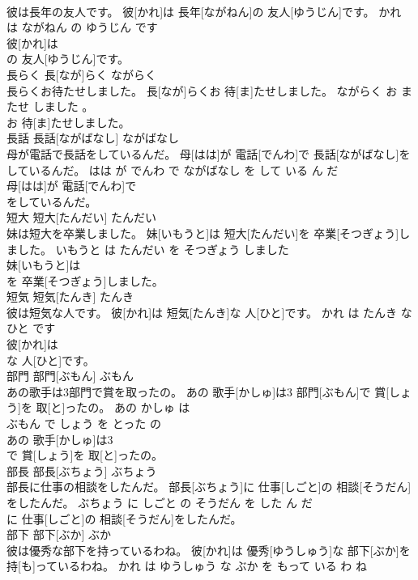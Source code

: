 \documentclass[8pt]{extreport}
\begin{document}
\begin{CJK}{UTF8}{min}
\\	彼は長年の友人です。	彼[かれ]は 長年[ながねん]の 友人[ゆうじん]です。	かれ は ながねん の ゆうじん です	
\\	彼[かれ]は
\\	の 友人[ゆうじん]です。			
\\	長らく	長[なが]らく	ながらく	
\\	長らくお待たせしました。	長[なが]らくお 待[ま]たせしました。	ながらく お またせ しました 。	
\\	お 待[ま]たせしました。			
\\	長話	長話[ながばなし]	ながばなし	
\\	母が電話で長話をしているんだ。	母[はは]が 電話[でんわ]で 長話[ながばなし]をしているんだ。	はは が でんわ で ながばなし を して いる ん だ	
\\	母[はは]が 電話[でんわ]で
\\	をしているんだ。			
\\	短大	短大[たんだい]	たんだい	
\\	妹は短大を卒業しました。	妹[いもうと]は 短大[たんだい]を 卒業[そつぎょう]しました。	いもうと は たんだい を そつぎょう しました	
\\	妹[いもうと]は
\\	を 卒業[そつぎょう]しました。			
\\	短気	短気[たんき]	たんき	
\\	彼は短気な人です。	彼[かれ]は 短気[たんき]な 人[ひと]です。	かれ は たんき な ひと です	
\\	彼[かれ]は
\\	な 人[ひと]です。			
\\	部門	部門[ぶもん]	ぶもん	
\\	あの歌手は3部門で賞を取ったの。	あの 歌手[かしゅ]は3 部門[ぶもん]で 賞[しょう]を 取[と]ったの。	あの かしゅ は 
\\	ぶもん で しょう を とった の	
\\	あの 歌手[かしゅ]は3
\\	で 賞[しょう]を 取[と]ったの。			
\\	部長	部長[ぶちょう]	ぶちょう	
\\	部長に仕事の相談をしたんだ。	部長[ぶちょう]に 仕事[しごと]の 相談[そうだん]をしたんだ。	ぶちょう に しごと の そうだん を した ん だ	
\\	に 仕事[しごと]の 相談[そうだん]をしたんだ。			
\\	部下	部下[ぶか]	ぶか	
\\	彼は優秀な部下を持っているわね。	彼[かれ]は 優秀[ゆうしゅう]な 部下[ぶか]を 持[も]っているわね。	かれ は ゆうしゅう な ぶか を もって いる わ ね	

\end{CJK}
\end{document}
